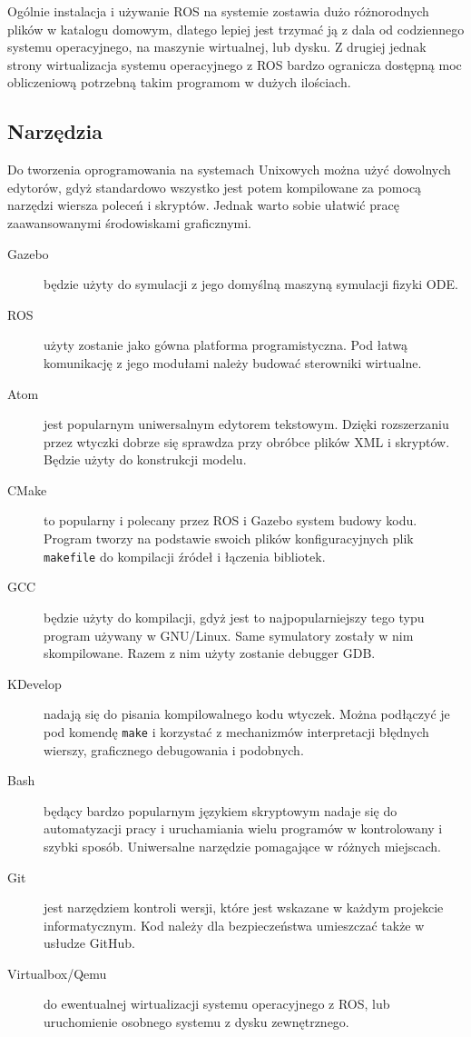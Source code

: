 	Ogólnie instalacja i używanie ROS na systemie zostawia dużo różnorodnych plików w katalogu domowym, dlatego lepiej jest trzymać ją z dala od codziennego systemu operacyjnego, na maszynie wirtualnej, lub dysku.
	Z drugiej jednak strony wirtualizacja systemu operacyjnego z ROS bardzo ogranicza dostępną moc obliczeniową potrzebną takim programom w dużych ilościach.

	\subsection{Narzędzia}
	Do tworzenia oprogramowania na systemach Unixowych można użyć dowolnych edytorów, gdyż standardowo wszystko jest potem kompilowane za pomocą narzędzi wiersza poleceń i skryptów.
	Jednak warto sobie ułatwić pracę zaawansowanymi środowiskami graficznymi.
	\begin{description}
	\item[Gazebo] będzie użyty do symulacji z jego domyślną maszyną symulacji fizyki ODE.
	\item[ROS] użyty zostanie jako gówna platforma programistyczna. Pod łatwą komunikację z jego modułami należy budować sterowniki wirtualne.
	\item[Atom] jest popularnym uniwersalnym edytorem tekstowym. Dzięki rozszerzaniu przez wtyczki dobrze się sprawdza przy obróbce plików XML i skryptów.
	Będzie użyty do konstrukcji modelu.
	\item[CMake] to popularny i polecany przez ROS i Gazebo system budowy kodu. Program tworzy na podstawie swoich plików konfiguracyjnych plik \texttt{makefile} do kompilacji źródeł i łączenia bibliotek.
	\item[GCC] będzie użyty do kompilacji, gdyż jest to najpopularniejszy tego typu program używany w GNU/Linux. Same symulatory zostały w nim skompilowane.
	Razem z nim użyty zostanie debugger GDB. 
	\item[KDevelop] nadają się do pisania kompilowalnego kodu wtyczek. Można podłączyć je pod komendę \texttt{make} i korzystać z mechanizmów interpretacji błędnych wierszy, graficznego debugowania i podobnych.
	\item[Bash] będący bardzo popularnym językiem skryptowym nadaje się do automatyzacji pracy i uruchamiania wielu programów w kontrolowany i szybki sposób.
	Uniwersalne narzędzie pomagające w różnych miejscach.
	\item[Git] jest narzędziem kontroli wersji, które jest wskazane w każdym projekcie informatycznym. Kod należy dla bezpieczeństwa umieszczać także w usłudze GitHub.
	\item[Virtualbox/Qemu] do ewentualnej wirtualizacji systemu operacyjnego z ROS, lub uruchomienie osobnego systemu z dysku zewnętrznego.
	\end{description}

